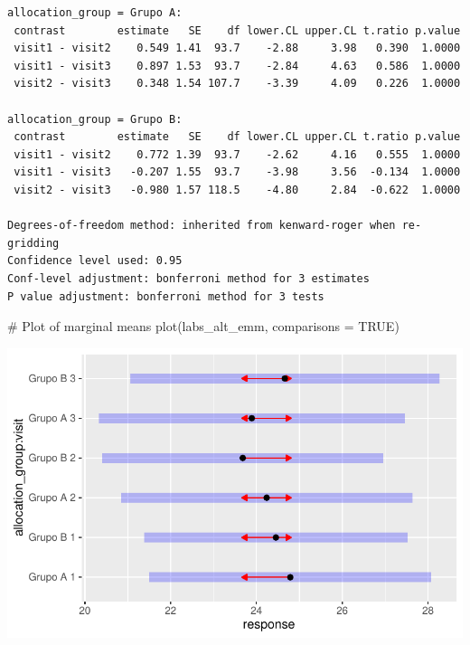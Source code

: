 \documentclass[
  letterpaper,
  DIV=11,
  numbers=noendperiod]{scrartcl}
\newenvironment{Shaded}{\begin{snugshade}}{\end{snugshade}}
\newcommand{\AttributeTok}[1]{\textcolor[rgb]{0.40,0.45,0.13}{#1}}
\newcommand{\CommentTok}[1]{\textcolor[rgb]{0.37,0.37,0.37}{#1}}
\newcommand{\ConstantTok}[1]{\textcolor[rgb]{0.56,0.35,0.01}{#1}}
\newcommand{\FunctionTok}[1]{\textcolor[rgb]{0.28,0.35,0.67}{#1}}
\newcommand{\NormalTok}[1]{\textcolor[rgb]{0.00,0.23,0.31}{#1}}
\begin{document}
\begin{verbatim}
allocation_group = Grupo A:
 contrast        estimate   SE    df lower.CL upper.CL t.ratio p.value
 visit1 - visit2    0.549 1.41  93.7    -2.88     3.98   0.390  1.0000
 visit1 - visit3    0.897 1.53  93.7    -2.84     4.63   0.586  1.0000
 visit2 - visit3    0.348 1.54 107.7    -3.39     4.09   0.226  1.0000

allocation_group = Grupo B:
 contrast        estimate   SE    df lower.CL upper.CL t.ratio p.value
 visit1 - visit2    0.772 1.39  93.7    -2.62     4.16   0.555  1.0000
 visit1 - visit3   -0.207 1.55  93.7    -3.98     3.56  -0.134  1.0000
 visit2 - visit3   -0.980 1.57 118.5    -4.80     2.84  -0.622  1.0000

Degrees-of-freedom method: inherited from kenward-roger when re-gridding 
Confidence level used: 0.95 
Conf-level adjustment: bonferroni method for 3 estimates 
P value adjustment: bonferroni method for 3 tests 
\end{verbatim}

\begin{Shaded}
\begin{Highlighting}[]
\CommentTok{\# Plot of marginal means}
\FunctionTok{plot}\NormalTok{(labs\_alt\_emm, }\AttributeTok{comparisons =} \ConstantTok{TRUE}\NormalTok{)}
\end{Highlighting}
\end{Shaded}

\includegraphics{Outcomes_V1V2V3_files/figure-pdf/labs_alt_sens_emm-1.pdf}
\end{document}
